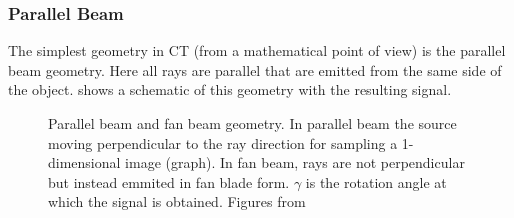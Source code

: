 \documentclass[10pt,journal,compsoc]{IEEEtran}
\begin{document}
\subsubsection{Parallel Beam}
The simplest geometry in CT (from a mathematical point of view) is the parallel beam geometry.
Here all rays are parallel that are emitted from the same side of the object.
 shows a schematic of this geometry with the resulting signal.
%
\begin{figure}[!h]
\centering
{}
\hfil
{}
\caption{Parallel beam and fan beam geometry. 
In parallel beam the source moving perpendicular to the ray direction for sampling a 1-dimensional image (graph). 
In fan beam, rays are not perpendicular but instead emmited in fan blade form. 
$\gamma$ is the rotation angle at which the signal is obtained. 
Figures from~\cite{Buzug2008_chap3,Buzug2008_chap4}}
\label{fig:parallalandfanbeam}
\end{figure}
\end{document}
